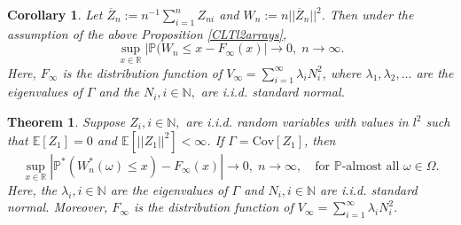 \documentclass[10pt,a4paper]{amsart}
\newtheorem{corollary}{Corollary}
\newtheorem{theorem}{Theorem}
\begin{document}
\begin{corollary} \label{normZnquer} Let $\overline{Z}_n := n^{-1} \sum_{i=1}^n Z_{ni}$ and $W_n:=n||\overline{Z}_n||^2.$ Then under the assumption of the above Proposition \ref{CLTl2arrays},
\begin{equation} \label{Vnpn}
 \sup_{x \in \mathbb{R}}|\mathbb{P}(W_n \le x - F_\infty(x)| \rightarrow 0, \; n \rightarrow \infty.
\end{equation}
Here, $F_\infty$ is the distribution function of $V_\infty = \sum_{i=1}^\infty \lambda_i N_i^2$, where $\lambda_1,\lambda_2,\ldots$ are the eigenvalues of $\Gamma$ and the $N_i, i \in \mathbb{N},$ are i.i.d. standard normal.
\end{corollary}

\begin{theorem} \label{bootstraphigh} Suppose $Z_i, i \in \mathbb{N},$ are i.i.d. random variables with values in $l^2$ such that
$\mathbb{E}[Z_1]=0$ and  $\mathbb{E}[||Z_1||^2] < \infty$. If $\Gamma = \text{Cov}[Z_1]$, then
\begin{equation} \label{uniformWnstar}
  \sup_{x \in \mathbb{R}}|\mathbb{P}^*(W_n^*(\omega) \le x)-F_\infty(x)| \rightarrow 0, \;  n \rightarrow \infty,\quad \text{for } \mathbb{P}\text{-almost all } \omega \in \Omega.
\end{equation}
Here, the $\lambda_i, i \in \mathbb{N}$ are the eigenvalues of $\Gamma$ and $N_i, i \in \mathbb{N}$ are i.i.d. standard normal. Moreover,  $F_\infty$ is the distribution function of $V_\infty=\sum_{i=1}^\infty \lambda_i N_i^2.$
\end{theorem}
\end{document}
